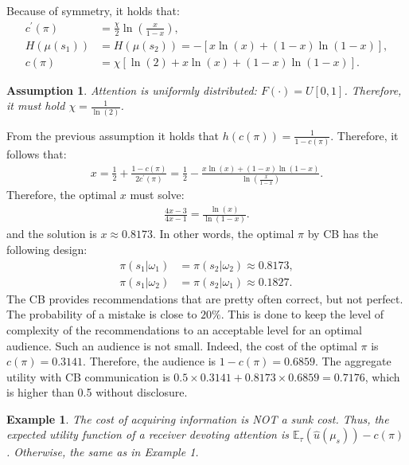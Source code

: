 \documentclass[12pt,a4paper]{article}
\newtheorem{assumption}{Assumption}
\newtheorem{example}{Example}
\begin{document}
Because of symmetry, it holds that:
\begin{align*}
    c^\prime(\pi) & = \frac{\chi}{2}\ln\left(\frac{x}{1-x}\right), \\
    H(\mu(s_1)) & = H(\mu(s_2))=-[x\ln(x)+(1-x)\ln(1-x)], \\
    c(\pi) & = \chi[\ln(2)+x\ln(x)+(1-x)\ln(1-x)].
\end{align*}
\begin{assumption}
    Attention is uniformly distributed: $F(\cdot)=U[0,1]$. Therefore, it must hold $\chi=\frac{1}{\ln(2)}$. 
\end{assumption}
From the previous assumption it holds that $h(c(\pi))=\frac{1}{1-c(\pi)}$. Therefore, it follows that:
\begin{align}
    x=\frac{1}{2}+\frac{1-c(\pi)}{2c^\prime(\pi)}=\frac{1}{2}-\frac{x\ln(x)+(1-x)\ln(1-x)}{\ln\left(\frac{x}{1-x}\right)}.
\end{align}
Therefore, the optimal $x$ must solve:
\begin{align}
    \frac{4x-3}{4x-1}=\frac{\ln(x)}{\ln(1-x)}.
\end{align}
and the solution is $x\approx 0.8173$. In other words, the optimal $\pi$ by CB has the following design:
\begin{align}
    \pi(s_1|\omega_1) & = \pi(s_2|\omega_2)\approx 0.8173, \\
    \pi(s_1|\omega_2) & = \pi(s_2|\omega_1)\approx 0.1827.
\end{align}
The CB provides recommendations that are pretty often correct, but not perfect. The probability of a mistake is close to $20\%$. This is done to keep the level of complexity of the recommendations to an acceptable level for an optimal audience. Such an audience is not small. Indeed, the cost of the optimal $\pi$ is $c(\pi)=0.3141$. Therefore, the audience is $1-c(\pi)=0.6859$. The aggregate utility with CB communication is $0.5 \times 0.3141 + 0.8173 \times  0.6859 = 0.7176$, which is higher than 0.5 without disclosure.

\begin{example}
    The cost of acquiring information is NOT a sunk cost. Thus, the expected utility function of a receiver devoting attention is $\mathbb{E}_{\tau}(\hat{u}(\mu_s))-c(\pi)$. Otherwise, the same as in Example 1.
\end{example}
\end{document}
